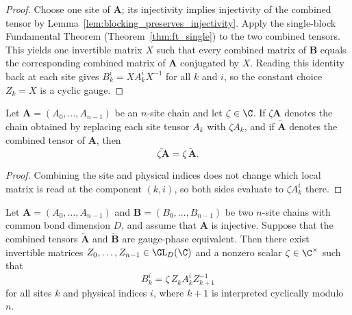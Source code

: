 \begin{proof}
    \leanok
    Choose one site of $\mathbf{A}$; its injectivity implies injectivity of
    the combined tensor by Lemma~\ref{lem:blocking_preserves_injectivity}.
    Apply the single-block Fundamental Theorem
    (Theorem~\ref{thm:ft_single}) to the two combined tensors.
    This yields one invertible matrix $X$ such that every combined matrix of
    $\mathbf{B}$ equals the corresponding combined matrix of
    $\mathbf{A}$ conjugated by $X$.
    Reading this identity back at each site gives
    $B_k^i = X A_k^i X^{-1}$ for all $k$ and $i$, so the constant choice
    $Z_k = X$ is a cyclic gauge.
\end{proof}

\begin{lemma}%
    \label{lem:chainCombinedTensor_smul_chain}
    \leanok
    Let $\mathbf{A} = (A_0, \ldots, A_{n-1})$ be an $n$-site chain and let
    $\zeta \in \C$. If $\zeta \mathbf{A}$ denotes the chain obtained by
    replacing each site tensor $A_k$ with $\zeta A_k$, and if
    $\widetilde{\mathbf{A}}$ denotes the combined tensor of $\mathbf{A}$,
    then
    \[
        \widetilde{\zeta \mathbf{A}} = \zeta\, \widetilde{\mathbf{A}}.
    \]
\end{lemma}

\begin{proof}
    \leanok
    Combining the site and physical indices does not change which local matrix
    is read at the component $(k,i)$, so both sides evaluate to
    $\zeta A_k^i$ there.
\end{proof}

\begin{theorem}%
    \label{thm:fundamentalTheorem_injective_chain_gaugePhase}
    \leanok
    Let $\mathbf{A} = (A_0, \ldots, A_{n-1})$ and
    $\mathbf{B} = (B_0, \ldots, B_{n-1})$ be two $n$-site chains with common
    bond dimension $D$, and assume that $\mathbf{A}$ is injective.
    Suppose that the combined tensors $\widetilde{\mathbf{A}}$ and
    $\widetilde{\mathbf{B}}$ are gauge-phase equivalent.
    Then there exist invertible matrices $Z_0, \ldots, Z_{n-1} \in \GL_D(\C)$
    and a nonzero scalar $\zeta \in \C^{\times}$ such that
    \begin{equation}\label{eq:aft_chain_gaugePhase_conj}
        B_k^i = \zeta\, Z_k A_k^i Z_{k+1}^{-1}
    \end{equation}
    for all sites $k$ and physical indices $i$, where $k+1$ is interpreted
    cyclically modulo $n$.
\end{theorem}

